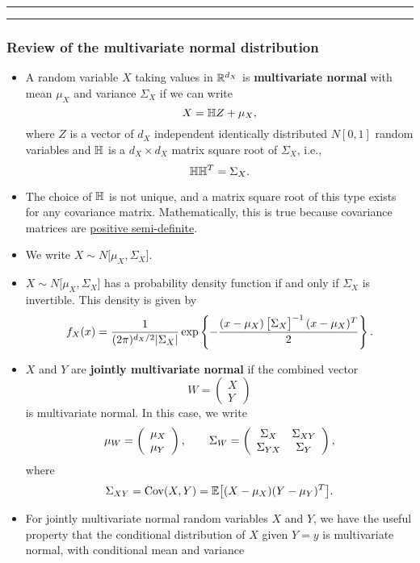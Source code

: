 \documentclass[]{article}
\begin{document}
\begin{center}\rule{0.5\linewidth}{\linethickness}\end{center}

\begin{center}\rule{0.5\linewidth}{\linethickness}\end{center}

\subsubsection{Review of the multivariate normal
distribution}\label{review-of-the-multivariate-normal-distribution}

\begin{itemize}
\item
  A random variable \(X\) taking values in \(\mathbb{R}^{d_X}\) is
  \textbf{multivariate normal} with mean \(\mu_X\) and variance
  \(\Sigma_X\) if we can write \[X = \mathbb{H} Z + \mu_X,\] where \(Z\) is a
  vector of \(d_X\) independent identically distributed \(N[0,1]\)
  random variables and \(\mathbb{H}\) is a \(d_X\times d_X\) matrix square
  root of \(\Sigma_X\), i.e., \[\mathbb{H}\mathbb{H}^{\scriptsize{T}} = \Sigma_X.\]
\item
  The choice of \(\mathbb{H}\) is not unique, and a matrix square root of
  this type exists for any covariance matrix. Mathematically, this is
  true because covariance matrices are
  \href{https://en.wikipedia.org/wiki/Positive-definite_matrix\#Positive-semidefinite}{positive
  semi-definite}.
\item
  We write \(X\sim N\big[\mu_X,\Sigma_X\big]\).
\item
  \(X\sim N\big[\mu_X,\Sigma_X\big]\) has a probability density function
  if and only if \(\Sigma_X\) is invertible. This density is given by
  \[f_X(x) = \frac{1}{(2\pi)^{d_X/2}|\Sigma_X|}
  \exp
    \left\{-
   \frac{ (x - \mu_X)\, \big[\Sigma_X\big]^{-1} \, (x - \mu_X)^{\scriptsize{T}}}{2}
    \right\}.
  \]
\item
  \(X\) and \(Y\) are \textbf{jointly multivariate normal} if the
  combined vector \[W=\left(\begin{array}{l}
  X \\
  Y
  \end{array}\right)\] is multivariate normal. In this case, we write \[
  \mu_W = \left(\begin{array}{l}
  \mu_X \\
  \mu_Y
  \end{array}\right),
  \quad\quad
  \Sigma_W = \left(\begin{array}{cc}
  \Sigma_X & \Sigma_{XY}\\
  \Sigma_{YX} & \Sigma_Y
  \end{array}\right),\] where
  \[\Sigma_{XY}= \mathrm{Cov}(X,Y) = \mathbb{E}\big[(X-\mu_X)(Y-\mu_Y)^{\scriptsize{T}}\big].\]
\item
  For jointly multivariate normal random variables \(X\) and \(Y\), we
  have the useful property that the conditional distribution of \(X\)
  given \(Y=y\) is multivariate normal, with conditional mean and
  variance
\end{itemize}
\end{document}
